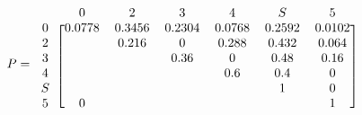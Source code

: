 
\begin{equation*}
P=
\begin{blockarray}{ccccccc}
 & 0 & 2 & 3 & 4 & S & 5 \\
\begin{block}{c[cccccc]}
0	&	0.0778	& 0.3456	& 0.2304  	& 0.0768	& 0.2592	& 0.0102 \\
2	&			& 0.216		& 0  		&0.288		& 0.432		& 0.064 \\
3	&			& 			& 0.36		& 0			& 0.48		& 0.16 \\
4	&			& 			& 			& 0.6		& 0.4		& 0\\
S	&			& 			& 			& 			& 1			& 0\\
5	&	0		& 			& 		  	& 			& 			& 1\\
\end{block}
\end{blockarray}
\label{exampleMatrixValues}
\end{equation*}

